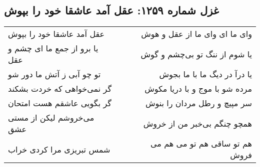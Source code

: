 \begin{center}
\section*{غزل شماره ۱۲۵۹: عقل آمد عاشقا خود را بپوش}
\label{sec:1259}
\begin{longtable}{l p{0.5cm} r}
عقل آمد عاشقا خود را بپوش
&&
وای ما ای وای ما از عقل و هوش
\\
یا برو از جمع ما ای چشم و عقل
&&
یا شوم از ننگ تو بی‌چشم و گوش
\\
تو چو آبی ز آتش ما دور شو
&&
یا درآ در دیگ ما با ما بجوش
\\
گر نمی‌خواهی که خردت بشکند
&&
مرده شو با موج و با دریا مکوش
\\
گر بگویی عاشقم هست امتحان
&&
سر مپیچ و رطل مردان را بنوش
\\
می‌خروشم لیکن از مستی عشق
&&
همچو چنگم بی‌خبر من از خروش
\\
شمس تبریزی مرا کردی خراب
&&
هم تو ساقی هم تو می هم می فروش
\\
\end{longtable}
\end{center}

